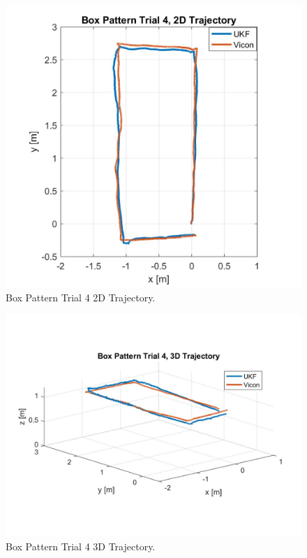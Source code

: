 \begin{figure}[p]
  \centering
    \includegraphics[height=0.6\textwidth]{box4_2d}
  \caption[Box Pattern Trial 4 2D Trajectory]{Box Pattern Trial 4 2D Trajectory.}
  \label{fig:box4_2d}
\end{figure}
\begin{figure}[p]
  \centering
    \includegraphics[height=0.7\textwidth]{box4_3d}
  \caption[Box Pattern Trial 4 3D Trajectory]{Box Pattern Trial 4 3D Trajectory.}
  \label{fig:box4_3d}
\end{figure}
\clearpage

